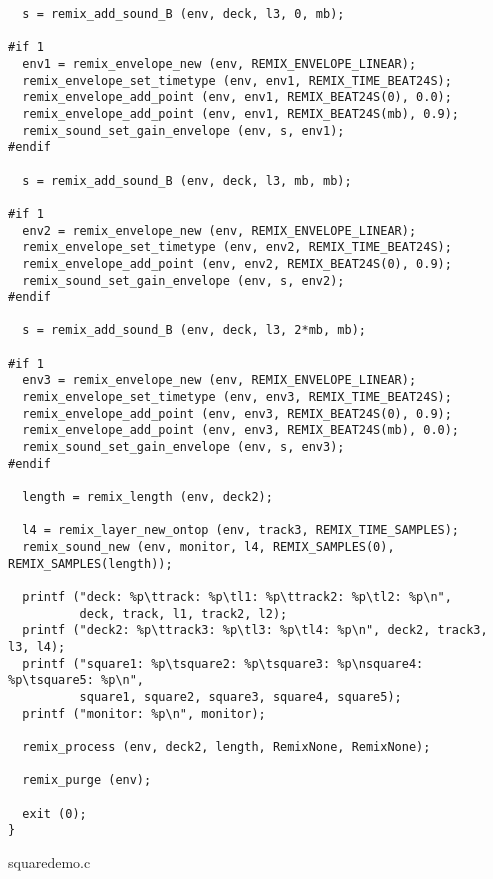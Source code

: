 \begin{verbatim}
  s = remix_add_sound_B (env, deck, l3, 0, mb);

#if 1
  env1 = remix_envelope_new (env, REMIX_ENVELOPE_LINEAR);
  remix_envelope_set_timetype (env, env1, REMIX_TIME_BEAT24S);
  remix_envelope_add_point (env, env1, REMIX_BEAT24S(0), 0.0);
  remix_envelope_add_point (env, env1, REMIX_BEAT24S(mb), 0.9);
  remix_sound_set_gain_envelope (env, s, env1);
#endif

  s = remix_add_sound_B (env, deck, l3, mb, mb);

#if 1
  env2 = remix_envelope_new (env, REMIX_ENVELOPE_LINEAR);
  remix_envelope_set_timetype (env, env2, REMIX_TIME_BEAT24S);
  remix_envelope_add_point (env, env2, REMIX_BEAT24S(0), 0.9);
  remix_sound_set_gain_envelope (env, s, env2);
#endif

  s = remix_add_sound_B (env, deck, l3, 2*mb, mb);

#if 1
  env3 = remix_envelope_new (env, REMIX_ENVELOPE_LINEAR);
  remix_envelope_set_timetype (env, env3, REMIX_TIME_BEAT24S);
  remix_envelope_add_point (env, env3, REMIX_BEAT24S(0), 0.9);
  remix_envelope_add_point (env, env3, REMIX_BEAT24S(mb), 0.0);
  remix_sound_set_gain_envelope (env, s, env3);
#endif

  length = remix_length (env, deck2);

  l4 = remix_layer_new_ontop (env, track3, REMIX_TIME_SAMPLES);
  remix_sound_new (env, monitor, l4, REMIX_SAMPLES(0), REMIX_SAMPLES(length));

  printf ("deck: %p\ttrack: %p\tl1: %p\ttrack2: %p\tl2: %p\n",
          deck, track, l1, track2, l2);
  printf ("deck2: %p\ttrack3: %p\tl3: %p\tl4: %p\n", deck2, track3, l3, l4);
  printf ("square1: %p\tsquare2: %p\tsquare3: %p\nsquare4: %p\tsquare5: %p\n",
          square1, square2, square3, square4, square5);
  printf ("monitor: %p\n", monitor);

  remix_process (env, deck2, length, RemixNone, RemixNone);

  remix_purge (env);

  exit (0);
}
\end{verbatim}\normalsize
 squaredemo.c 


